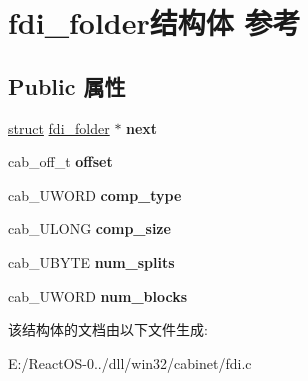 \hypertarget{structfdi__folder}{}\section{fdi\+\_\+folder结构体 参考}
\label{structfdi__folder}
\subsection*{Public 属性}
\begin{DoxyCompactItemize}
\item 
\mbox{\label{structfdi__folder_a1875ed990a33904928165ae5ad2d13c5}} 
\hyperlink{interfacestruct}{struct} \hyperlink{structfdi__folder}{fdi\+\_\+folder} $\ast$ {\bfseries next}
\item 
\mbox{\label{structfdi__folder_ad2e1a63dcffede46d0e0372f58c4c379}} 
cab\+\_\+off\+\_\+t {\bfseries offset}
\item 
\mbox{\label{structfdi__folder_a0b4de23ef4a4b44a23ef556629bc9430}} 
cab\+\_\+\+U\+W\+O\+RD {\bfseries comp\+\_\+type}
\item 
\mbox{\label{structfdi__folder_aae5574d6c6dc99cc1bae24227323b483}} 
cab\+\_\+\+U\+L\+O\+NG {\bfseries comp\+\_\+size}
\item 
\mbox{\label{structfdi__folder_aeeccf0da42d71e7fbfb5fff5f6e8d37f}} 
cab\+\_\+\+U\+B\+Y\+TE {\bfseries num\+\_\+splits}
\item 
\mbox{\label{structfdi__folder_aaa00120f5ca5be2583353841462b1d32}} 
cab\+\_\+\+U\+W\+O\+RD {\bfseries num\+\_\+blocks}
\end{DoxyCompactItemize}


该结构体的文档由以下文件生成\+:\begin{DoxyCompactItemize}
\item 
E\+:/\+React\+O\+S-\/0../dll/win32/cabinet/fdi.\+c\end{DoxyCompactItemize}
